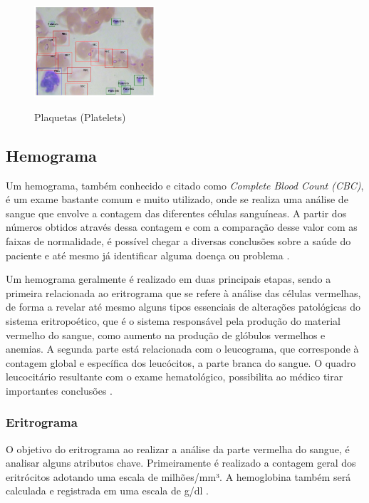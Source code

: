 \begin{figure}[!htb]
	\centering
	\caption{Plaquetas (Platelets)}
	\includegraphics[width=0.40\textwidth]{img/plt.jpg}
	\label{fig:plaquetas}
\end{figure}

\subsection{Hemograma}
Um hemograma, também conhecido e citado como \emph{Complete Blood Count (CBC)}, é um exame bastante comum e muito utilizado, onde se realiza uma análise de sangue que envolve a contagem das diferentes células sanguíneas. A partir dos números obtidos através dessa contagem e com a comparação desse valor com as faixas de normalidade, é possível chegar a diversas conclusões sobre a saúde do paciente e até mesmo já identificar alguma doença ou problema \cite{manualHematologia, abcOfCbc}.

Um hemograma geralmente é realizado em duas principais etapas, sendo a primeira relacionada ao eritrograma que se refere à análise das células vermelhas, de forma a revelar até mesmo alguns tipos essenciais de alterações patológicas do sistema eritropoético, que é o sistema responsável pela produção do material vermelho do sangue, como aumento na produção de glóbulos vermelhos e anemias. A segunda parte está relacionada com o leucograma, que corresponde à contagem global e específica dos leucócitos, a parte branca do sangue. O quadro leucocitário resultante com o exame hematológico, possibilita ao médico tirar importantes conclusões \cite{manualHematologia, abcOfCbc}.

\subsubsection{Eritrograma}
O objetivo do eritrograma ao realizar a análise da parte vermelha do sangue, é analisar alguns atributos chave. Primeiramente é realizado a contagem geral dos eritrócitos adotando uma escala de milhões/mm³. A hemoglobina também será calculada e registrada em uma escala de g/dl \cite{interpretacaoHemograma, manualHematologia}.

